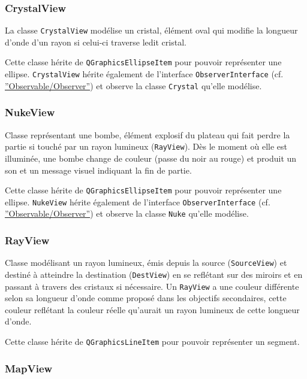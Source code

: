 \documentclass[]{article}
\begin{document}
\subsubsection{\label{CrystalView}CrystalView}

La classe \texttt{CrystalView} modélise un cristal, élément oval qui modifie la longueur d’onde d’un rayon si
celui-ci traverse ledit cristal.

Cette classe hérite de \texttt{QGraphicsEllipseItem} pour pouvoir représenter une ellipse.
\texttt{CrystalView} hérite également de l'interface \texttt{ObserverInterface} (cf. \hyperref[OO]{''Observable/Observer''}) et observe
la classe \texttt{Crystal} qu'elle modélise.

\subsubsection{\label{NukeView}NukeView}

Classe représentant une bombe, élément explosif du plateau qui fait perdre la partie
si touché par un rayon lumineux (\texttt{RayView}). Dès le moment où elle est illuminée, une bombe
change de couleur (passe du noir au rouge) et produit un son et un message visuel indiquant la fin de partie.

Cette classe hérite de \texttt{QGraphicsEllipseItem} pour pouvoir représenter une ellipse.
\texttt{NukeView} hérite également de l'interface \texttt{ObserverInterface} (cf. \hyperref[OO]{''Observable/Observer''}) et observe
la classe \texttt{Nuke} qu'elle modélise.

\subsubsection{\label{RayView}RayView}

Classe modélisant un rayon lumineux, émis depuis la source (\texttt{SourceView}) et destiné à atteindre la destination 
(\texttt{DestView}) en se reflétant sur des miroirs et en passant à travers des cristaux si nécessaire.
Un \texttt{RayView} a une couleur différente selon sa longueur d’onde comme proposé dans les objectifs secondaires,
cette couleur reflétant la couleur réelle qu’aurait un rayon lumineux de cette longueur d’onde.

Cette classe hérite de \texttt{QGraphicsLineItem} pour pouvoir représenter un segment.

\subsubsection{\label{MapView}MapView}
\end{document}

